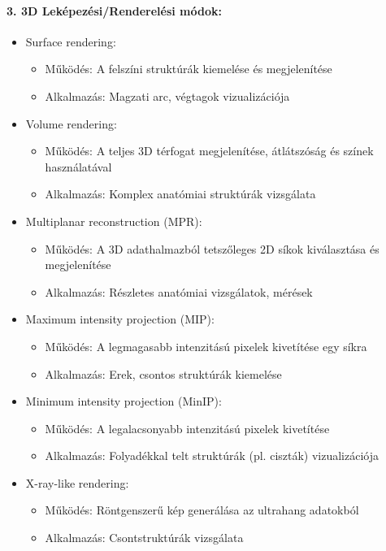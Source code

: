 \documentclass[a4paper,12pt]{article}
\begin{document}
\paragraph{3. 3D Leképezési/Renderelési módok:} \begin{itemize} \item Surface rendering: \begin{itemize} \item Működés: A felszíni struktúrák kiemelése és megjelenítése \item Alkalmazás: Magzati arc, végtagok vizualizációja \end{itemize} \item Volume rendering: \begin{itemize} \item Működés: A teljes 3D térfogat megjelenítése, átlátszóság és színek használatával \item Alkalmazás: Komplex anatómiai struktúrák vizsgálata \end{itemize} \item Multiplanar reconstruction (MPR): \begin{itemize} \item Működés: A 3D adathalmazból tetszőleges 2D síkok kiválasztása és megjelenítése \item Alkalmazás: Részletes anatómiai vizsgálatok, mérések \end{itemize} \item Maximum intensity projection (MIP): \begin{itemize} \item Működés: A legmagasabb intenzitású pixelek kivetítése egy síkra \item Alkalmazás: Erek, csontos struktúrák kiemelése \end{itemize} \item Minimum intensity projection (MinIP): \begin{itemize} \item Működés: A legalacsonyabb intenzitású pixelek kivetítése \item Alkalmazás: Folyadékkal telt struktúrák (pl. ciszták) vizualizációja \end{itemize} \item X-ray-like rendering: \begin{itemize} \item Működés: Röntgenszerű kép generálása az ultrahang adatokból \item Alkalmazás: Csontstruktúrák vizsgálata \end{itemize} \end{itemize}
\end{document}
